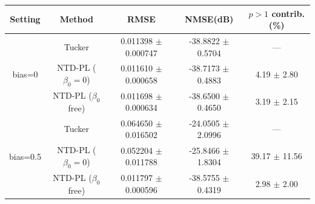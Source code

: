 \begin{tabular}{c|c|c|c|c}
    \hline
    Setting & Method & RMSE & NMSE(dB) & $p>1$ contrib. (\%) \\
    \hline
    \multirow{3}{*}{bias=0} & Tucker & 0.011398 $\pm$ 0.000747 & -38.8822 $\pm$ 0.5704 & --- \\
     & NTD-PL ($\beta_0 = 0$) & 0.011610 $\pm$ 0.000658 & -38.7173 $\pm$ 0.4883 & 4.19 $\pm$ 2.80 \\
     & NTD-PL ($\beta_0$ free) & 0.011698 $\pm$ 0.000634 & -38.6500 $\pm$ 0.4650 & 3.19 $\pm$ 2.15 \\
    \hline
    \multirow{3}{*}{bias=0.5} & Tucker & 0.064650 $\pm$ 0.016502 & -24.0505 $\pm$ 2.0996 & --- \\
     & NTD-PL ($\beta_0 = 0$) & 0.052204 $\pm$ 0.011788 & -25.8466 $\pm$ 1.8304 & 39.17 $\pm$ 11.56 \\
     & NTD-PL ($\beta_0$ free) & 0.011797 $\pm$ 0.000596 & -38.5755 $\pm$ 0.4319 & 2.98 $\pm$ 2.00 \\
    \hline
\end{tabular}
